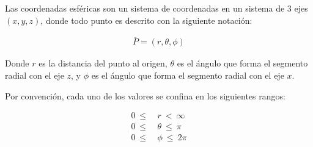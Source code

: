 Las coordenadas esféricas son un sistema de coordenadas en un sistema de 3 ejes ${\left(x,y,z\right)}$, donde todo punto es descrito con la siguiente notación:

\begin{eqnarray*}
  \overline{P}=\left(r,\theta,\phi\right)
\end{eqnarray*}

Donde ${r}$ es la distancia del punto al origen, ${\theta}$ es el ángulo que forma el segmento radial con el eje ${z}$, y ${\phi}$ es el ángulo que forma el segmento radial con el eje ${x}$.

Por convención, cada uno de los valores se confina en los siguientes rangos:

\begin{equation*}
  \begin{split}
    0\ \leq\ &r\ <\ \infty\\
    0\ \leq\ &\theta\ \leq\ \pi\\
    0\ \leq\ &\phi\ \leq\ 2\pi
  \end{split}
\end{equation*}
